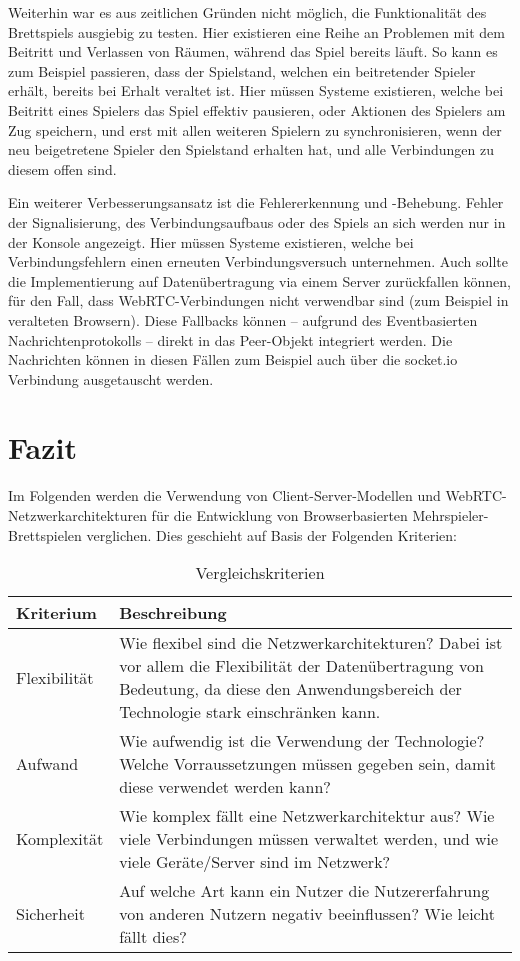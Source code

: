 Weiterhin war es aus zeitlichen Gründen nicht möglich, die Funktionalität des Brettspiels ausgiebig zu testen. Hier existieren eine Reihe an Problemen mit dem Beitritt und Verlassen von Räumen, während das Spiel bereits läuft. So kann es zum Beispiel passieren, dass der Spielstand, welchen ein beitretender Spieler erhält, bereits bei Erhalt veraltet ist. Hier müssen Systeme existieren, welche bei Beitritt eines Spielers das Spiel effektiv pausieren, oder Aktionen des Spielers am Zug speichern, und erst mit allen weiteren Spielern zu synchronisieren, wenn der neu beigetretene Spieler den Spielstand erhalten hat, und alle Verbindungen zu diesem offen sind.\par

Ein weiterer Verbesserungsansatz ist die Fehlererkennung und -Behebung. Fehler der Signalisierung, des Verbindungsaufbaus oder des Spiels an sich werden nur in der Konsole angezeigt. Hier müssen Systeme existieren, welche bei Verbindungsfehlern einen erneuten Verbindungsversuch unternehmen. Auch sollte die Implementierung auf Datenübertragung via einem Server zurückfallen können, für den Fall, dass WebRTC-Verbindungen nicht verwendbar sind (zum Beispiel in veralteten Browsern). Diese Fallbacks können -- aufgrund des Eventbasierten Nachrichtenprotokolls -- direkt in das Peer-Objekt integriert werden. Die Nachrichten können in diesen Fällen zum Beispiel auch über die socket.io Verbindung ausgetauscht werden.\par

\chapter{Fazit}
Im Folgenden werden die Verwendung von Client-Server-Modellen und WebRTC-Netzwerkarchitekturen für die Entwicklung von Browserbasierten Mehrspieler-Brettspielen verglichen. Dies geschieht auf Basis der Folgenden Kriterien:

\begin{table}[ht]
\centering
\begin{tabularx}{\textwidth}{lX}
\toprule
Kriterium&Beschreibung\\
\midrule
Flexibilität&Wie flexibel sind die Netzwerkarchitekturen? Dabei ist vor allem die Flexibilität der Datenübertragung von Bedeutung, da diese den Anwendungsbereich der Technologie stark einschränken kann.\\
Aufwand&Wie aufwendig ist die Verwendung der Technologie? Welche Vorraussetzungen müssen gegeben sein, damit diese verwendet werden kann?\\
Komplexität&Wie komplex fällt eine Netzwerkarchitektur aus? Wie viele Verbindungen müssen verwaltet werden, und wie viele Geräte/Server sind im Netzwerk?\\
Sicherheit&Auf welche Art kann ein Nutzer die Nutzererfahrung von anderen Nutzern negativ beeinflussen? Wie leicht fällt dies?\\
\bottomrule

\end{tabularx}
\caption{Vergleichskriterien}
\label{table:idk}
\end{table}

